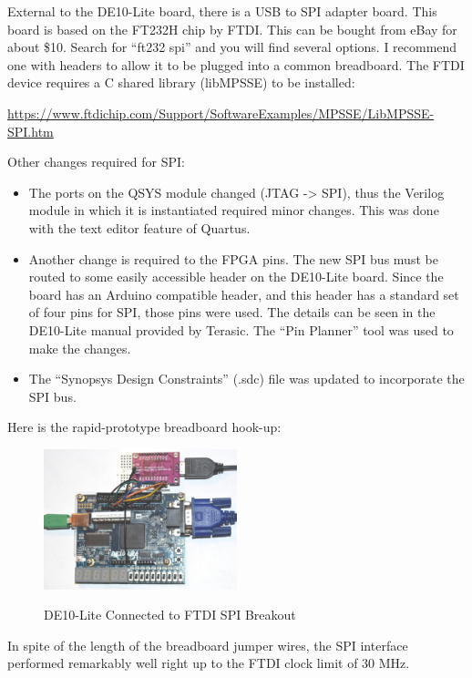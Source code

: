 External to the DE10-Lite board, there is a USB to SPI adapter board.  This board is based on the FT232H chip by FTDI.  This can be bought from eBay for about \$10.  Search for ``ft232 spi'' and you will find several options.  I recommend one with headers to allow it to be plugged into a common breadboard.  The FTDI device requires a C shared library (libMPSSE) to be installed:

\url{https://www.ftdichip.com/Support/SoftwareExamples/MPSSE/LibMPSSE-SPI.htm}

Other changes required for SPI:

\begin{itemize}
	\item The ports on the QSYS module changed (JTAG -> SPI), thus the Verilog module in which it is instantiated required minor changes.  This was done with the text editor feature of Quartus.
    \item Another change is required to the FPGA pins.  The new SPI bus must be routed to some easily accessible header on the DE10-Lite board.  Since the board has an Arduino compatible header, and this header has a standard set of four pins for SPI, those pins were used.  The details can be seen in the DE10-Lite manual provided by Terasic.  The ``Pin Planner'' tool was used to make the changes.
    \item The ``Synopsys Design Constraints'' (.sdc) file was updated to incorporate the SPI bus.
\end{itemize}

Here is the rapid-prototype breadboard hook-up:

\begin{figure}[h]
	\centering
	\includegraphics[width=0.5\textwidth]{images/de10_spi}
	\centering\bfseries
	\caption{DE10-Lite Connected to FTDI SPI Breakout}
\end{figure}

In spite of the length of the breadboard jumper wires, the SPI interface performed remarkably well right up to the FTDI clock limit of 30 MHz.










